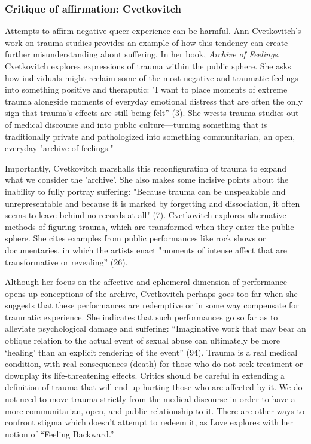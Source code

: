 \documentclass[11pt]{article}
\begin{document}
\subsubsection{Critique of affirmation: Cvetkovitch}
\label{sec:orgba1d927}

Attempts to affirm negative queer experience can be harmful. Ann
Cvetkovitch's work on trauma studies provides an example of how this
tendency can create further misunderstanding about suffering. In her
book, \emph{Archive of Feelings}, Cvetkovitch explores expressions of
trauma within the public sphere. She asks how individuals might
reclaim some of the most negative and traumatic feelings into
something positive and theraputic: "I want to place moments of extreme
trauma alongside moments of everyday emotional distress that are often
the only sign that trauma's effects are still being felt” (3). She
wrests trauma studies out of medical discourse and into public
culture---turning something that is traditionally private and
pathologized into something communitarian, an open, everyday "archive
of feelings."

Importantly, Cvetkovitch marshalls this reconfiguration of trauma to
expand what we consider the 'archive'. She also makes some incisive
points about the inability to fully portray suffering: "Because trauma
can be unspeakable and unrepresentable and because it is marked by
forgetting and dissociation, it often seems to leave behind no records
at all" (7). Cvetkovitch explores alternative methods of figuring
trauma, which are transformed when they enter the public sphere. She
cites examples from public performances like rock shows or
documentaries, in which the artists enact "moments of intense affect
that are transformative or revealing” (26). 

Although her focus on the affective and ephemeral dimension of
performance opens up conceptions of the archive, Cvetkovitch perhaps
goes too far when she suggests that these performances are redemptive
or in some way compensate for traumatic experience. She indicates that
such performances go so far as to alleviate psychological damage and
suffering: “Imaginative work that may bear an oblique relation to the
actual event of sexual abuse can ultimately be more ‘healing’ than an
explicit rendering of the event” (94). Trauma is a real medical
condition, with real consequences (death) for those who do not seek
treatment or downplay its life-threatening effects. Critics should be
careful in extending a definition of trauma that will end up hurting
those who are affected by it. We do not need to move trauma strictly
from the medical discourse in order to have a more communitarian,
open, and public relationship to it. There are other ways to confront
stigma which doesn’t attempt to redeem it, as Love explores with her
notion of “Feeling Backward.”
\end{document}

